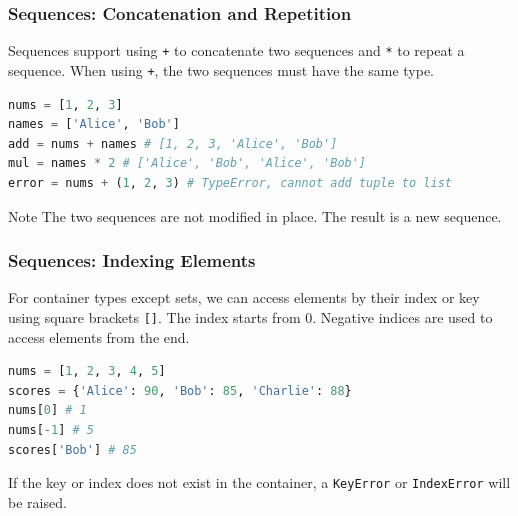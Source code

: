 \documentclass[beamer, en, version=2.0]{huangfusl-template}
\begin{document}
    \begin{frame}[fragile]
        \frametitle{Sequences: Concatenation and Repetition}

        Sequences support using {\footnotesize\verb|+|} to concatenate two sequences and {\footnotesize\verb|*|} to repeat a sequence. When using {\footnotesize\verb|+|}, the two sequences must have the same type.

\begin{lstlisting}[language=python]
nums = [1, 2, 3]
names = ['Alice', 'Bob']
add = nums + names # [1, 2, 3, 'Alice', 'Bob']
mul = names * 2 # ['Alice', 'Bob', 'Alice', 'Bob']
error = nums + (1, 2, 3) # TypeError, cannot add tuple to list
\end{lstlisting}

        \begin{block}{Note}
            The two sequences are not modified in place. The result is a new sequence.
        \end{block}
    \end{frame}
    \begin{frame}[fragile]
        \frametitle{Sequences: Indexing Elements}

        For container types except sets, we can access elements by their index or key using square brackets {\footnotesize\verb|[]|}. {\color{darkred}The index starts from 0}. Negative indices are used to access elements from the end.

\begin{lstlisting}[language=python]
nums = [1, 2, 3, 4, 5]
scores = {'Alice': 90, 'Bob': 85, 'Charlie': 88}
nums[0] # 1
nums[-1] # 5
scores['Bob'] # 85
\end{lstlisting}

    If the key or index does not exist in the container, a {\footnotesize\verb|KeyError|} or {\footnotesize\verb|IndexError|} will be raised.

    \end{frame}
\end{document}

